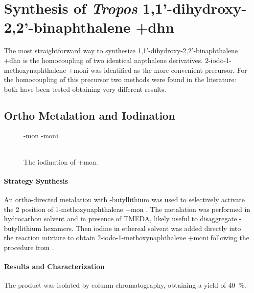 \section{Synthesis of \emph{Tropos} 1,1'-di\-hydroxy-2,2'-bi\-naphthalene \cmpd+{dhn}}
  The most straightforward way to synthesize 1,1’-di\-hydroxy-2,2’-bi\-naphthalene \cmpd+{dhn} is the homo\-coupling of two identical napthalene derivatives. 2-iodo-1-methoxy\-naphthalene \cmpd+{moni} was identified as the more convenient precursor. For the homo\-coupling of this precursor two methods were found in the literature: both have been tested obtaining very different results.

\subsection{Ortho Metalation and Iodination}
  \begin{figure}
    \cmpdref-{mon}
    \cmpdref-{moni}
  \caption{\\ The iodination of \cmpd+{mon}.\label{sc:mon-moni}}
  \end{figure}
  \paragraph{Strategy Synthesis}
    An ortho-directed metalation with \n-butyl\-lithium was used to selectively activate the 2 position of 1-methoxy\-naphthalene \cmpd+{mon} \cite{Shirley1969}. The metalation was performed in hydrocarbon solvent and in presence of TMEDA, likely useful to disaggregate \n-butyl\-lithium hexamers. Then iodine in ethereal solvent was added directly into the reaction mixture to obtain 2-iodo-1-methoxy\-naphthalene \cmpd+{moni} following the procedure from \citet{Cox1992}. 

  \paragraph{Results and Characterization}
    The product was isolated by column chromatography, obtaining a yield of 40~\%. 

